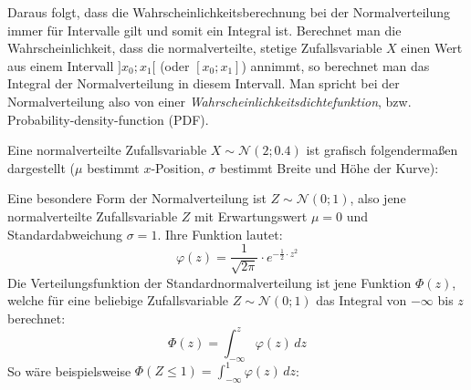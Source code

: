 Daraus folgt, dass die Wahrscheinlichkeitsberechnung bei der Normalverteilung immer f\"{u}r Intervalle gilt und somit ein Integral ist. Berechnet man die Wahrscheinlichkeit, dass die normalverteilte, stetige Zufallsvariable $X$ einen Wert aus einem Intervall $]x_{0}; x_{1}[$ (oder $[x_{0};x_{1}]$) annimmt, so berechnet man das Integral der Normalverteilung in diesem Intervall. Man spricht bei der Normalverteilung also von einer \emph{Wahrscheinlichkeitsdichtefunktion}, bzw. Probability-density-function (PDF).

Eine normalverteilte Zufallsvariable $X \sim \mathcal{N}(2; 0.4)$ ist grafisch folgenderma\ss{}en dargestellt ($\mu$ bestimmt $x$-Position, $\sigma$ bestimmt Breite und H\"{o}he der Kurve):

\vspace{0.25cm}

\begin{figure}[h!]
\end{figure}

\pagebreak


Eine besondere Form der Normalverteilung ist $Z \sim \mathcal{N}(0; 1)$, also jene normalverteilte Zufallsvariable $Z$ mit Erwartungswert $\mu = 0$ und Standardabweichung $\sigma = 1$. Ihre Funktion lautet: $$\varphi(z) = \frac{1}{\sqrt{2\pi}} \cdot e^{-\frac{1}{2} \cdot z^2}$$ Die Verteilungsfunktion der Standardnormalverteilung ist jene Funktion $\Phi(z)$, welche f\"{u}r eine beliebige Zufallsvariable $Z \sim \mathcal{N}(0; 1)$ das Integral von $-\infty$ bis $z$ berechnet: $$\Phi(z) = \int_{-\infty}^{z} \varphi(z) \, dz$$ So w\"{a}re beispielsweise $\Phi(Z\leq1) = \int_{-\infty}^{1} \varphi(z) \, dz$:

